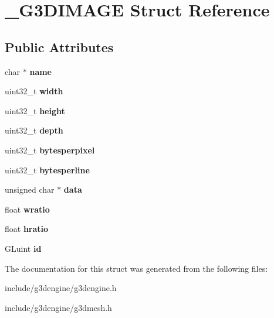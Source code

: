 \hypertarget{struct__G3DIMAGE}{}\section{\+\_\+\+G3\+D\+I\+M\+A\+GE Struct Reference}
\label{struct__G3DIMAGE}
\subsection*{Public Attributes}
\begin{DoxyCompactItemize}
\item 
\mbox{\label{struct__G3DIMAGE_ad8cc3013d302a60668a7fe5256257b9c}} 
char $\ast$ {\bfseries name}
\item 
\mbox{\label{struct__G3DIMAGE_a9b61c83c2ff313cc6ee65565d03431cf}} 
uint32\+\_\+t {\bfseries width}
\item 
\mbox{\label{struct__G3DIMAGE_ae1070468960c1a6eb28ebb4b4e68127f}} 
uint32\+\_\+t {\bfseries height}
\item 
\mbox{\label{struct__G3DIMAGE_aa50d652b1825e646dabb3422314f65b8}} 
uint32\+\_\+t {\bfseries depth}
\item 
\mbox{\label{struct__G3DIMAGE_a03ea0aa9c2023886f9ec7bcbc405adaa}} 
uint32\+\_\+t {\bfseries bytesperpixel}
\item 
\mbox{\label{struct__G3DIMAGE_a48f26b9ea91e7f54f5111ea52a7c8c96}} 
uint32\+\_\+t {\bfseries bytesperline}
\item 
\mbox{\label{struct__G3DIMAGE_aecf79af244262b0b9c58f11dc0364b29}} 
unsigned char $\ast$ {\bfseries data}
\item 
\mbox{\label{struct__G3DIMAGE_a168f9a3cc217648c111d171732b7d77d}} 
float {\bfseries wratio}
\item 
\mbox{\label{struct__G3DIMAGE_a2659120d93aec9121ec3f7e5fe793ba1}} 
float {\bfseries hratio}
\item 
\mbox{\label{struct__G3DIMAGE_af747756dd8929c895fa77720f872df54}} 
G\+Luint {\bfseries id}
\end{DoxyCompactItemize}


The documentation for this struct was generated from the following files\+:\begin{DoxyCompactItemize}
\item 
include/g3dengine/g3dengine.\+h\item 
include/g3dengine/g3dmesh.\+h\end{DoxyCompactItemize}
